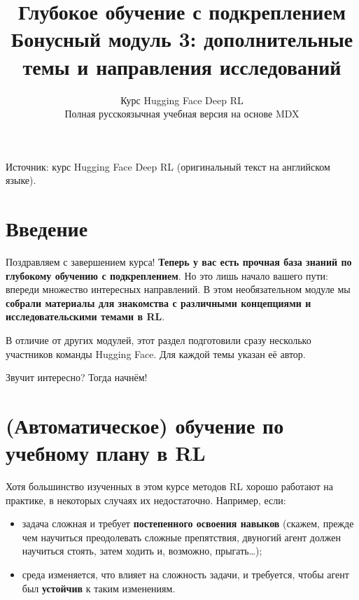 \documentclass[11pt,a4paper]{article}
\title{\textbf{Глубокое обучение с подкреплением}\\[0.35em]\large Бонусный модуль 3: дополнительные темы и направления исследований}
\author{Курс Hugging Face Deep RL\\\small Полная русскоязычная учебная версия на основе MDX}
\date{}
\begin{document}
\selectfont
\maketitle
\vspace{-0.65em}
\begin{center}\small\color{secondary}Источник: курс Hugging Face Deep RL (оригинальный текст на английском языке).\end{center}
\begingroup\small\setlength{\parskip}{0pt}\tableofcontents\endgroup
\vspace{0.4em}
\section{Введение}\label{introduction}


Поздравляем с завершением курса! \textbf{Теперь у вас есть прочная база знаний по глубокому обучению с подкреплением}. Но это лишь начало вашего пути: впереди множество интересных направлений. В этом необязательном модуле мы \textbf{собрали материалы для знакомства с различными концепциями и исследовательскими темами в RL}.

В отличие от других модулей, этот раздел подготовили сразу несколько участников команды Hugging Face. Для каждой темы указан её автор.

Звучит интересно? Тогда начнём!

\section{(Автоматическое) обучение по учебному плану в RL}\label{automatic-curriculum-learning-for-rl}

Хотя большинство изученных в этом курсе методов RL хорошо работают на практике, в некоторых случаях их недостаточно. Например, если:

\begin{itemize}
\item
  задача сложная и требует \textbf{постепенного освоения навыков} (скажем, прежде чем научиться преодолевать сложные препятствия, двуногий агент должен научиться стоять, затем ходить и, возможно, прыгать\ldots{});
\item
  среда изменяется, что влияет на сложность задачи, и требуется, чтобы агент был \textbf{устойчив} к таким изменениям.
\end{itemize}
\end{document}
